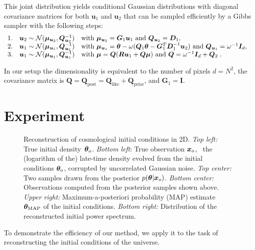 This joint distribution yields conditional Gaussian distributions with diagonal covariance matrices for both $\bm u_1$ and $\bm u_2$ that can be sampled efficiently by a Gibbs sampler with the following steps:
\begin{equation}
\begin{array}{ccl}
    1. & \bm u_2\sim\mathcal{N}(\bm \mu_{\bm u_2}, \bm Q^{-1}_{\bm u_2}) & \text{with } \bm \mu_{\bm u_2} = \bm G_1 \bm u_1 \text{ and }\bm Q_{\boldsymbol u_2} = \boldsymbol D_1, \\
    2.  & \bm u_1\sim\mathcal{N}(\bm \mu_{\bm u_1}, \bm Q^{-1}_{\bm u_1})  & \text{with } \bm \mu_{\bm u_1} = \bm{\theta} - \omega(\bm Q_1 \bm{\theta} - \bm G_1^T \bm D_1^{-1} \bm u_2) \text{ and } \bm Q_{\bm u_1} = \omega^{-1} \bm I_d, \\
    3.  & \bm u_1\sim\mathcal{N}(\bm \mu_{\bm u_1}, \bm Q^{-1}_{\bm u_1}) & \text{with }\bm \mu = \bm Q(\bm R \bm  u_1 + \bm  Q \bm \mu) \text{ and } \bm Q = \omega^{-1} \bm I_d + \bm Q_2 \;.
\end{array}
\end{equation}

In our setup the dimensionality is equivalent to the number of pixels $d=N^2$, the covariance matrix is $\bm Q = \bm Q_{\text{post}} = \bm Q_{\text{like}} + \bm Q_{\text{prior}}$, and $\bm G_1= \bm I$.


\section{Experiment} \label{sec:cosmo-exp}
\begin{figure}
    \centering
    \caption{Reconstruction of cosmological initial conditions in 2D. {\it Top left:} True initial density~${\bm{\theta}}_o$. {\it Bottom left}: True observation ${\bm{x}}_o$, \ie\ the (logarithm of the) late-time density evolved from the initial conditions ${\bm{\theta}}_o$, corrupted by uncorrelated Gaussian noise. {\it Top center:} Two samples drawn from the posterior $p(\bm{\theta} | \bm {\bm{x}}_o)$. {\it Bottom center:} Observations computed from the posterior samples shown above. {\it Upper right:} Maximum-a-posteriori probability (MAP) estimate ${\bm{\theta}}_{\text{MAP}}$ of the initial conditions. {\it Bottom right:} Distribution of the reconstructed initial power spectrum.}
    \label{fig:results}
\end{figure} 

To demonstrate the efficiency of our method, we apply it to the task of reconstructing the initial conditions of the universe. 

